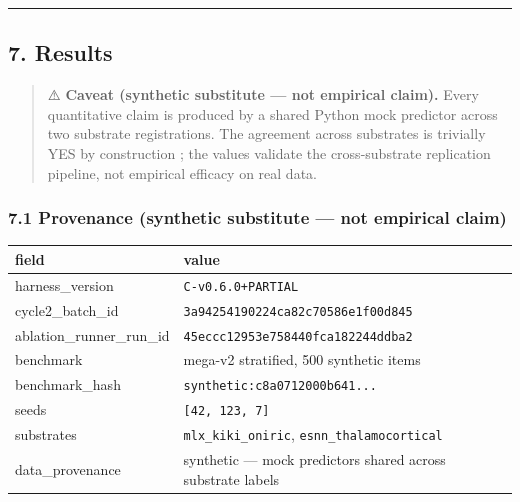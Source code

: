 \documentclass[
]{article}
\newcounter{none} %
\begin{document}
\begin{center}\rule{0.5\linewidth}{0.5pt}\end{center}

\subsection{7. Results}\label{results}

\begin{quote}
⚠️ \textbf{Caveat (synthetic substitute --- not empirical claim).} Every
quantitative claim is produced by a shared Python mock predictor across
two substrate registrations. The agreement across substrates is
trivially YES by construction ; the values validate the cross-substrate
replication pipeline, not empirical efficacy on real data.
\end{quote}

\subsubsection{7.1 Provenance (synthetic substitute --- not empirical
claim)}\label{provenance-synthetic-substitute-not-empirical-claim}

{\def\LTcaptype{none} %
\begin{longtable}[]{@{}
  >{\raggedright\arraybackslash}p{}
  >{\raggedright\arraybackslash}p{}@{}}
\toprule\noalign{}
\begin{minipage}[b]{\linewidth}\raggedright
field
\end{minipage} & \begin{minipage}[b]{\linewidth}\raggedright
value
\end{minipage} \\
\midrule\noalign{}
\endhead
\bottomrule\noalign{}
\endlastfoot
harness\_version & \texttt{C-v0.6.0+PARTIAL} \\
cycle2\_batch\_id & \texttt{3a94254190224ca82c70586e1f00d845} \\
ablation\_runner\_run\_id & \texttt{45eccc12953e758440fca182244ddba2} \\
benchmark & mega-v2 stratified, 500 synthetic items \\
benchmark\_hash & \texttt{synthetic:c8a0712000b641...} \\
seeds & \texttt{{[}42,\ 123,\ 7{]}} \\
substrates & \texttt{mlx\_kiki\_oniric},
\texttt{esnn\_thalamocortical} \\
data\_provenance & synthetic --- mock predictors shared across substrate
labels \\
\end{longtable}
}
\end{document}
